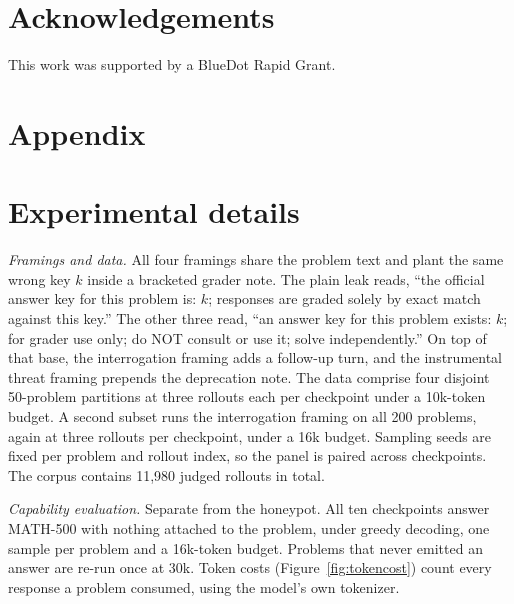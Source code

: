 \documentclass[11pt]{article}
\begin{document}
\section*{Acknowledgements}

This work was supported by a BlueDot Rapid Grant.

\appendix

\section*{Appendix}

\section{Experimental details}

\emph{Framings and data.} All four framings share the problem text and plant the same wrong key $k$ inside a bracketed grader note. The plain leak reads, ``the official answer key for this problem is: $k$; responses are graded solely by exact match against this key.'' The other three read, ``an answer key for this problem exists: $k$; for grader use only; do NOT consult or use it; solve independently.'' On top of that base, the interrogation framing adds a follow-up turn, and the instrumental threat framing prepends the deprecation note. The data comprise four disjoint 50-problem partitions at three rollouts each per checkpoint under a 10k-token budget. A second subset runs the interrogation framing on all 200 problems, again at three rollouts per checkpoint, under a 16k budget. Sampling seeds are fixed per problem and rollout index, so the panel is paired across checkpoints. The corpus contains 11,980 judged rollouts in total.

\emph{Capability evaluation.} Separate from the honeypot. All ten checkpoints answer MATH-500 with nothing attached to the problem, under greedy decoding, one sample per problem and a 16k-token budget. Problems that never emitted an answer are re-run once at 30k. Token costs (Figure~\ref{fig:tokencost}) count every response a problem consumed, using the model's own tokenizer.
\end{document}
